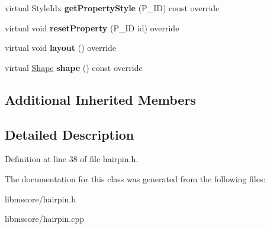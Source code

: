 \begin{DoxyCompactItemize}
virtual Style\+Idx {\bfseries get\+Property\+Style} (P\+\_\+\+ID) const override
\item 
\mbox{\label{class_ms_1_1_hairpin_segment_abe44fe45630b0da92b9ac96b54b6eb04}} 
virtual void {\bfseries reset\+Property} (P\+\_\+\+ID id) override
\item 
\mbox{\label{class_ms_1_1_hairpin_segment_a666f8b9cc04337fe85158f78b1368d76}} 
virtual void {\bfseries layout} () override
\item 
\mbox{\label{class_ms_1_1_hairpin_segment_ac4a894338cc90feeff8f3db6ddc874bf}} 
virtual \hyperlink{class_ms_1_1_shape}{Shape} {\bfseries shape} () const override
\end{DoxyCompactItemize}
\subsection*{Additional Inherited Members}


\subsection{Detailed Description}


Definition at line 38 of file hairpin.\+h.



The documentation for this class was generated from the following files\+:\begin{DoxyCompactItemize}
\item 
libmscore/hairpin.\+h\item 
libmscore/hairpin.\+cpp\end{DoxyCompactItemize}
